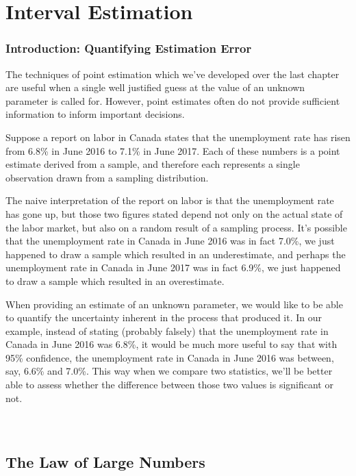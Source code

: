 \pagestyle{headings}
\chapter{Interval Estimation} \label{chp 7}
\thispagestyle{fancy}

\subsection*{Introduction: Quantifying Estimation Error}
The techniques of point estimation which we've developed over the last chapter are useful when a single well justified guess at the value of an unknown parameter is called for. However, point estimates often do not provide sufficient information to inform important decisions.
\par
Suppose a report on labor in Canada states that the unemployment rate has risen from 6.8\% in June 2016 to 7.1\% in June 2017. Each of these numbers is a point estimate derived from a sample, and therefore each represents a single observation drawn from a sampling distribution.
\par
The naive interpretation of the report on labor is that the unemployment rate has gone up, but those two figures stated depend not only on the actual state of the labor market, but also on a random result of a sampling process. It's possible that the unemployment rate in Canada in June 2016 was in fact 7.0\%, we just happened to draw a sample which resulted in an underestimate, and perhaps the unemployment rate in Canada in June 2017 was in fact 6.9\%, we just happened to draw a sample which resulted in an overestimate.
\par
When providing an estimate of an unknown parameter, we would like to be able to quantify the uncertainty inherent in the process that produced it. In our example, instead of stating (probably falsely) that the unemployment rate in Canada in June 2016 was 6.8\%, it would be much more useful to say that with 95\% confidence, the unemployment rate in Canada in June 2016 was between, say, 6.6\% and 7.0\%. This way when we compare two statistics, we'll be better able to assess whether the difference between those two values is significant or not.
\ \\
\ \\
\ \\

\section{The Law of Large Numbers}

